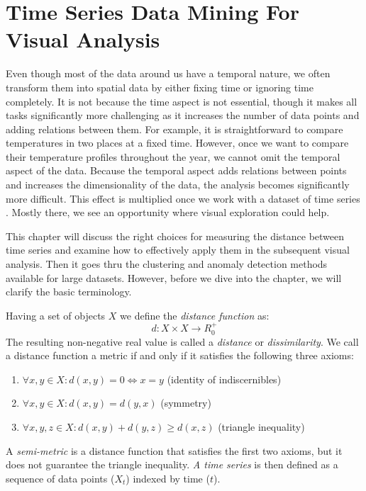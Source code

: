 \chapter{Time Series Data Mining For Visual Analysis}
Even though most of the data around us have a temporal nature, we often transform them into spatial data by either fixing time or ignoring time completely. It is not because the time aspect is not essential, though it makes all tasks significantly more challenging as it increases the number of data points and adding relations between them.  For example, it is straightforward to compare temperatures in two places at a fixed time. However, once we want to compare their temperature profiles throughout the year, we cannot omit the temporal aspect of the data. Because the temporal aspect adds relations between points and increases the dimensionality of the data, the analysis becomes significantly more difficult. This effect is multiplied once we work with a dataset of time series \cite{met:vis-data-help}. Mostly there, we see an opportunity where visual exploration could help.

This chapter will discuss the right choices for measuring the distance between time series and examine how to effectively apply them in the subsequent visual analysis. Then it goes thru the clustering and anomaly detection methods available for large datasets. However, before we dive into the chapter, we will clarify the basic terminology.

Having a set of objects $X$ we define the \textit{distance function} as:
\begin{equation}
    d: X \times X \rightarrow R^{+}_0 
\end{equation}
The resulting non-negative real value is called a \textit{distance} or \textit{dissimilarity}. We call a distance function a metric if and only if it satisfies the following three axioms:
\begin{enumerate}
    \item $\forall x, y \in X: d(x, y) = 0 \Leftrightarrow x = y $ (identity of indiscernibles)
    \item $\forall x, y \in X: d(x, y) = d(y, x)$ (symmetry)
    \item $\forall x, y, z \in X: d(x, y) + d(y, z) \ge d(x, z)$ (triangle inequality)
\end{enumerate}
A \textit{semi-metric} is a distance function that satisfies the first two axioms, but it does not guarantee the triangle inequality.
\textit{A time series} is then defined as a sequence of data points ($X_t$) indexed by time ($t$).

